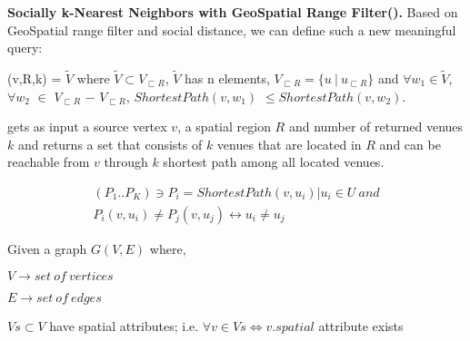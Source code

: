 \textbf{Socially k-Nearest Neighbors with GeoSpatial Range Filter({\query}). } Based on GeoSpatial range filter and social distance, we can define such a new meaningful query:
\begin{defn}
	{\query}(v,R,k) = $\widetilde{V}$ where $\widetilde{V}\subset V_{\sqsubset R}$, $\widetilde{V}$ has n elements, $V_{\sqsubset R} = \{u~|~u_{\sqsubset R}\}$ and $\forall w_1\in \widetilde{V}$, $\forall w_2$ $\in$ $V_{\sqsubset R}$ $-$ $V_{\sqsubset R}$, $ShortestPath(v,w_1)$ $\leqslant ShortestPath(v,w_2)$.
\end{defn}

{\query} gets as input a source vertex $v$, a spatial region $R$ and number of returned venues $k$ and returns a set that consists of $k$ venues that are located in $R$ and can be reachable from $v$ through $k$ shortest path among all located venues.

\iffalse
\begin{eqnarray*}
  	(P_1..P_K) \ni P_i = ShortestPath(v, u_i) | u_i \in U\ and\\
  	P_i(v, u_i) \neq P_j(v, u_j) \leftrightarrow u_i \neq u_j
\end{eqnarray*}


Given a graph $G(V, E)$ where,

\quad$V \rightarrow set\ of\ vertices$

\quad$E \rightarrow set\ of\ edges$

$Vs \subset V$ have spatial attributes; i.e. $\forall v \in Vs \Leftrightarrow v.spatial$ attribute exists\\


